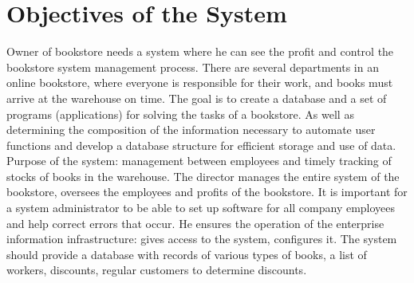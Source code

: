 \section{Objectives of the System}
Owner of bookstore needs a system where he can see the profit and control the bookstore system management process.
There are several departments in an online bookstore, where everyone is responsible for their work, and books must arrive at the warehouse on time.
The goal is to create a database and a set of programs (applications) for solving the tasks of a bookstore. As well as determining the composition of the information necessary to automate user functions and develop a database structure for efficient storage and use of data.
Purpose of the system: management between employees and timely tracking of stocks of books in the warehouse.
The director manages the entire system of the bookstore, oversees the employees and profits of the bookstore.
It is important for a system administrator to be able to set up software for all company employees and help correct errors that occur. He ensures the operation of the enterprise information infrastructure: gives access to the system, configures it.
The system should provide a database with records of various types of books, a list of workers, discounts, regular customers to determine discounts.